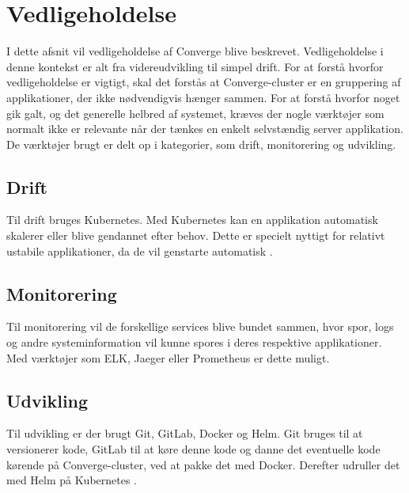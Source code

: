 \chapter{Vedligeholdelse}

I dette afsnit vil vedligeholdelse af Converge blive beskrevet. Vedligeholdelse i denne kontekst er alt fra videreudvikling til simpel drift. For at forstå hvorfor vedligeholdelse er vigtigt, skal det forstås at Converge-cluster er en gruppering af applikationer, der ikke nødvendigvis hænger sammen. For at forstå hvorfor noget gik galt, og det generelle helbred af systemet, kræves der nogle værktøjer som normalt ikke er relevante når der tænkes en enkelt selvstændig server applikation.
De værktøjer brugt er delt op i kategorier, som drift, monitorering og udvikling. 

\section{Drift}
Til drift bruges Kubernetes. Med Kubernetes kan en applikation automatisk skalerer eller blive gendannet efter behov. Dette er specielt nyttigt for relativt ustabile applikationer, da de vil genstarte automatisk \cite{deployment}. 

\section{Monitorering}
Til monitorering vil de forskellige services blive bundet sammen, hvor spor, logs og andre systeminformation vil kunne spores i deres respektive applikationer. Med værktøjer som ELK, Jaeger eller Prometheus er dette muligt. 

\section{Udvikling}
Til udvikling er der brugt Git, GitLab, Docker og Helm. Git bruges til at versionerer kode, GitLab til at køre denne kode og danne det eventuelle kode kørende på Converge-cluster, ved at pakke det med Docker. Derefter udruller det med Helm på Kubernetes \cite{development-environment}.
